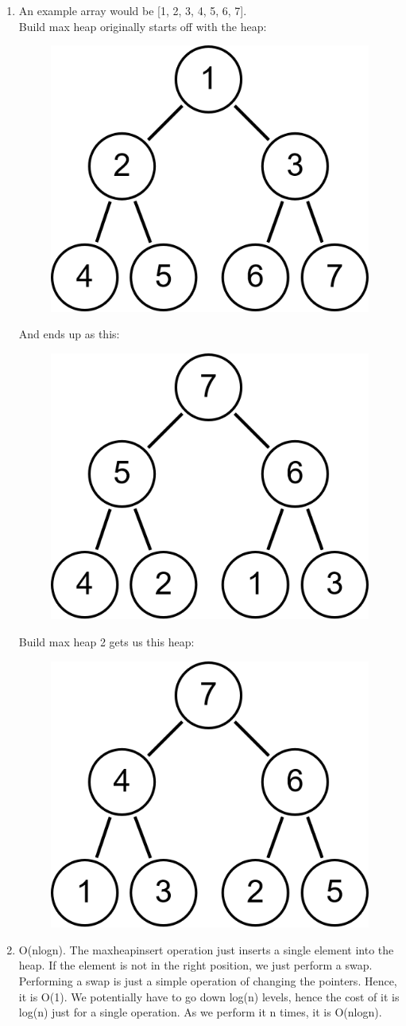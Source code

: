 \documentclass[12pt,letterpaper]{article}
\begin{document}
\begin{enumerate}
    \item 
    An example array would be [1, 2, 3, 4, 5, 6, 7]. \\
    
    Build max heap originally starts off with the heap:
    \begin{figure}[!h]
      \centering
      \includegraphics[width=0.2\linewidth]{mh1_before.png}
      \end{figure}
      
    And ends up as this:
    \begin{figure}[!h]
      \centering
      \includegraphics[width=0.2\linewidth]{mh1_after.png}
      \end{figure}
      
    Build max heap 2 gets us this heap:
    \begin{figure}[!h]
      \centering
      \includegraphics[width=0.2\linewidth]{mh2_after.png}
      \end{figure}
      
    \item 
    O(nlogn). 
    The maxheapinsert operation just inserts a single element into the heap. 
    If the element is not in the right position, we just perform a swap.
    Performing a swap is just a simple operation of changing the pointers.
    Hence, it is O(1). We potentially have to go down log(n) levels, 
    hence the cost of it is log(n) just for a single operation.
    As we perform it n times, it is O(nlogn).

\end{enumerate}
\end{document}
